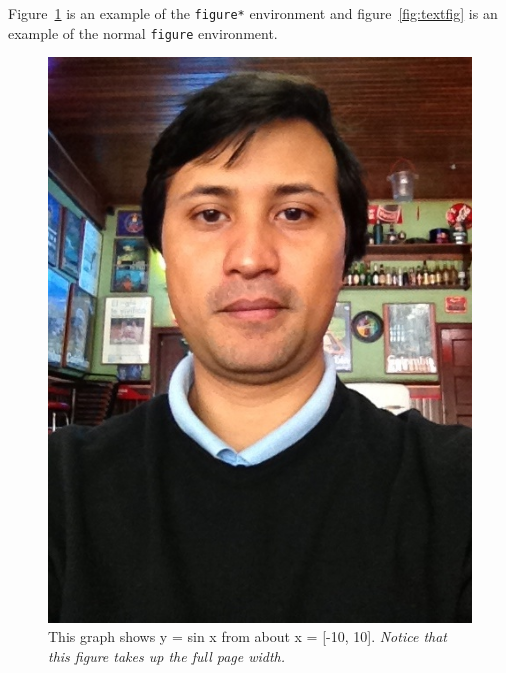 \documentclass{tufte-handout}
\begin{document}
Figure~\ref{fig:fullfig} is an example of the \Verb|figure*|
environment and figure~\ref{fig:textfig} is an example of the normal
\Verb|figure| environment.

\begin{figure}[h]
  \includegraphics[width=\linewidth]{foto.png}%
  \caption{This graph shows y = sin x from about x = [-10, 10].
  \emph{Notice that this figure takes up the full page width.}}%
  \label{fig:fullfig}%
\end{figure}
\end{document}
